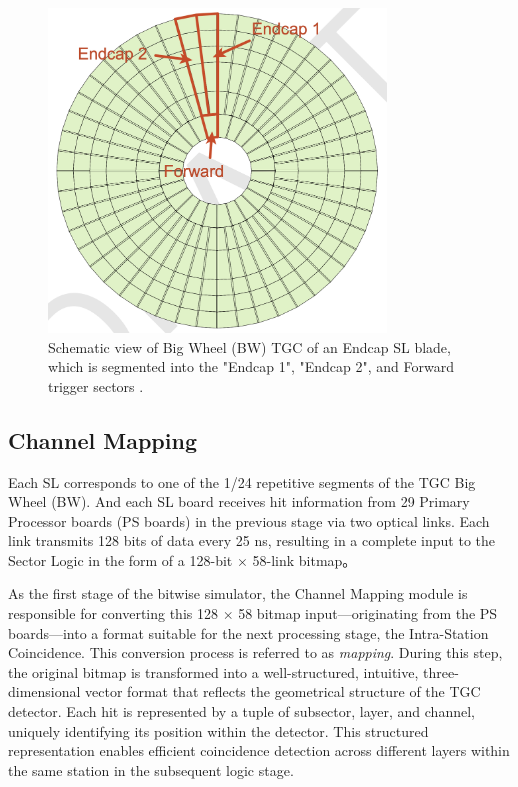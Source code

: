 \begin{figure}[htbp]
  \centering
  \includegraphics[width=0.8\textwidth]{figs/chapter5/endcap_and_forward_region.png}
  \caption{Schematic view of Big Wheel (BW) TGC of an Endcap SL blade, which is segmented into the "Endcap 1", "Endcap 2", and Forward trigger sectors \cite{EndcapSLPDR}.}
  \label{fig:endcapAndForward}
\end{figure}

\subsection{Channel Mapping} \label{subsec:ChannelMapping}
Each SL corresponds to one of the 1/24 repetitive segments of the TGC Big Wheel (BW). And each SL board receives hit information from 29 Primary Processor boards (PS boards) in the previous stage via two optical links. Each link transmits 128 bits of data every 25 ns, resulting in a complete input to the Sector Logic in the form of a 128-bit $\times$ 58-link bitmap。

As the first stage of the bitwise simulator, the Channel Mapping module is responsible for converting this 128 $\times$ 58 bitmap input—originating from the PS boards—into a format suitable for the next processing stage, the Intra-Station Coincidence. This conversion process is referred to as \textit{mapping}. During this step, the original bitmap is transformed into a well-structured, intuitive, three-dimensional vector format that reflects the geometrical structure of the TGC detector. Each hit is represented by a tuple of subsector, layer, and channel, uniquely identifying its position within the detector. This structured representation enables efficient coincidence detection across different layers within the same station in the subsequent logic stage.
